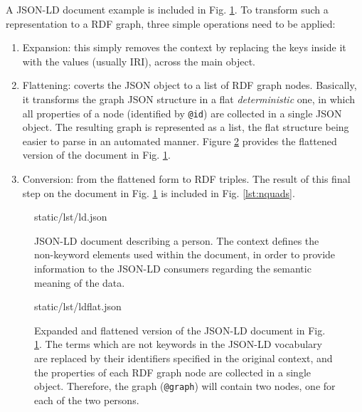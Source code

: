 A JSON-LD document example is included in Fig. \ref{lst:jsonld}. To transform
such a representation to a RDF graph, three simple operations need to be applied:
\begin{enumerate}
  \item Expansion: this simply removes the context by replacing the keys inside
                   it with the values (usually IRI), across the main object.
  \item Flattening: coverts the JSON object to a list of RDF graph nodes.
                    Basically, it transforms the graph JSON structure in a
                    flat \textit{deterministic} one, in which all properties of
                    a node (identified by \texttt{@id}) are collected in a
                    single JSON object. The resulting graph is represented as
                    a list, the flat structure being easier to parse in an
                    automated manner. Figure \ref{lst:ldflat} provides the
                    flattened version of the document in Fig. \ref{lst:jsonld}.
  \item Conversion: from the flattened form to RDF triples. The result of this
                    final step on the document in Fig. \ref{lst:jsonld} is
                    included in Fig. \ref{lst:nquads}.
\end{enumerate}

\begin{figure}[!ht]
  
    {static/lst/ld.json}
    \caption[JSON-LD document describing a person]
            {JSON-LD document describing a person. The context defines the
             non-keyword elements used within the document, in order to provide
             information to the JSON-LD consumers regarding the semantic
             meaning of the data.}
    \label{lst:jsonld}
\end{figure}

\begin{figure}[!ht]
  
    {static/lst/ldflat.json}
    \caption[Expanded and flattened JSON-LD document]
            {Expanded and flattened version of the JSON-LD document in
             Fig. \ref{lst:jsonld}. The terms which are not keywords in the
             JSON-LD vocabulary are replaced by their identifiers specified in
             the original context, and the properties of each RDF graph node are
             collected in a single object. Therefore, the graph
             (\texttt{@graph}) will contain two nodes, one for each of the two
             persons.}
    \label{lst:ldflat}
\end{figure}

